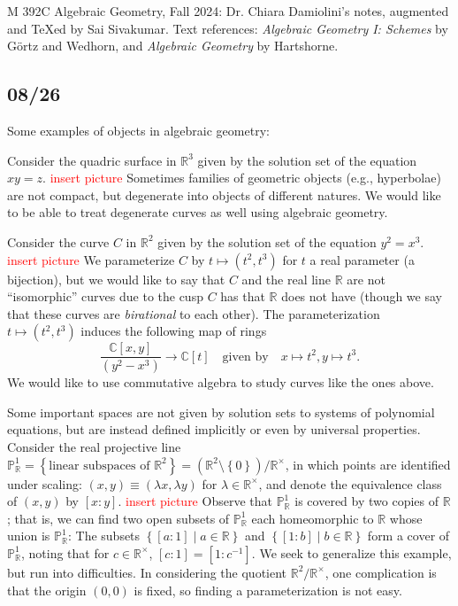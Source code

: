 \documentclass[11pt,leqno]{article}
\theoremstyle{plain}
\theoremstyle{definition}
\numberwithin{equation}{section}
\numberwithin{lem}{section}
\newcommand{\cbr}[1]{\left\{#1\right\}}
\begin{document}
M 392C Algebraic Geometry, Fall 2024: Dr. Chiara Damiolini's notes, augmented and \TeX ed by Sai Sivakumar. Text references: \textit{Algebraic Geometry I: Schemes} by G\"ortz and Wedhorn, and \textit{Algebraic Geometry} by Hartshorne.
\subsection*{08/26}
Some examples of objects in algebraic geometry:

Consider the quadric surface in $\mathbb R^3$ given by the solution set of the equation $xy = z$.
\textcolor{red}{insert picture}
Sometimes families of geometric objects (e.g., hyperbolae) are not compact, but degenerate into objects of different natures.
We would like to be able to treat degenerate curves as well using algebraic geometry.

Consider the curve $C$ in $\mathbb R^2$ given by the solution set of the equation $y^2 = x^3$.
\textcolor{red}{insert picture}
We parameterize $C$ by $t\mapsto (t^2,t^3)$ for $t$ a real parameter (a bijection), but we would like to say that $C$ and the real line $\mathbb R$ are not ``isomorphic'' curves due to the cusp $C$ has that $\mathbb R$ does not have (though we say that these curves are \textit{birational} to each other). The parameterization $t\mapsto (t^2, t^3)$ induces the following map of rings
\begin{equation}
  \frac{\mathbb C[x,y]}{(y^2-x^3)}\to \mathbb C[t]\quad \text{given by}\quad  x\mapsto t^2, y\mapsto t^3.
\end{equation}
We would like to use commutative algebra to study curves like the ones above.

Some important spaces are not given by solution sets to systems of polynomial equations, but are instead defined implicitly or even by universal properties.
Consider the real projective line $\mathbb P_{\mathbb R}^1 = \cbr{\text{linear subspaces of }\mathbb R^2} = (\mathbb R^2\setminus\cbr{0})/\mathbb R^\times$, in which points are identified under scaling: $(x,y)\equiv (\lambda x,\lambda y)$ for $\lambda\in \mathbb R^\times$, and denote the equivalence class of $(x,y)$ by $[x:y]$. \textcolor{red}{insert picture}
Observe that $\mathbb P_{\mathbb R}^1$ is covered by two copies of $\mathbb R$; that is, we can find two open subsets of $\mathbb P_{\mathbb R}^1$ each homeomorphic to $\mathbb R$ whose union is $\mathbb P_{\mathbb R}^1$: The subsets $\cbr{[a:1]\mid a\in\mathbb R}$ and $\cbr{[1:b]\mid b\in \mathbb R}$ form a cover of $\mathbb P_{\mathbb R}^1$, noting that for $c\in\mathbb R^\times$, $[c:1] = [1:c^{-1}]$.
We seek to generalize this example, but run into difficulties. 
In considering the quotient $\mathbb R^2/\mathbb R^\times$, one complication is that the origin $(0,0)$ is fixed, so finding a parameterization is not easy.
\end{document}
